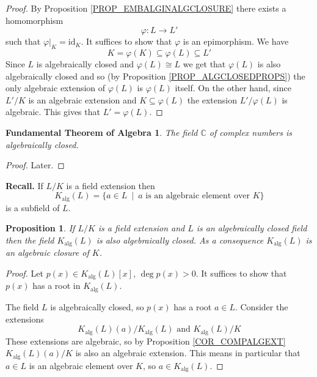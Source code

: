 \documentclass[12pt, letterpaper, oneside]{article}
\theoremstyle{plain}
\newtheorem{proposition}[theorem]{Proposition}
\newtheorem{FTALG}[theorem]{Fundamental Theorem of Algebra}
\theoremstyle{definition}
\newcommand{\C}{{\mathbb C}}
\newcommand{\id}{\mathrm{id}}
\newcommand{\vs}{\vskip 5mm}
\begin{document}
\vs\vs

\begin{proof}
By Proposition \ref{PROP_EMBALGINALGCLOSURE} there exists a homomorphism 
$$\varphi\colon L \to L'$$
such that $\varphi|_{K} = \id_{K}$. It suffices to show that $\varphi$ is an epimorphism. 
We have 
$$K = \varphi(K) \subseteq \varphi(L) \subseteq L'$$
Since $L$ is algebraically closed and $\varphi(L)\cong L$ we get that $\varphi(L)$ is 
also algebraically closed and so (by Proposition \ref{PROP_ALGCLOSEDPROPS})
the only algebraic extension of $\varphi(L)$ is $\varphi(L)$ itself. 
On the other hand, since $L'/K$ is an algebraic extension and 
$K\subseteq \varphi(L)$ the extension $L'/\varphi(L)$ is algebraic. This gives 
that $L' = \varphi(L)$.
\end{proof}



\vs\vs

\begin{FTALG}
\label{THM_FTALG}
The field $\C$ of complex numbers is algebraically closed. 
\end{FTALG}

\vs\vs

\begin{proof}
Later.
\end{proof}



\vs\vs


\textbf{Recall.} If $L/K$ is a field extension then 
$$K_{\text{alg}}(L) = \{a\in L \ \mid \ a \text{ is an algebraic element over } K\}$$
is a subfield of $L$. 


\vs\vs

\begin{proposition}
\label{PROP_KALGLALGCL}
If $L/K$ is a field extension and $L$ is an algebraically closed field then the field 
$K_{\text{alg}}(L)$ is also algebraically closed. As a consequence $K_{\text{alg}}(L)$
is an algebraic closure of $K$.
\end{proposition}

\vs

\begin{proof}
Let $p(x) \in K_{\text{alg}}(L)[x]$, $\deg p(x) >0$. It suffices to show that $p(x)$ has a root 
in $K_{\text{alg}}(L)$. 


The field  $L$ is algebraically closed, so  
$p(x)$ has a root $a\in L$. Consider the extensions 
$$ K_{\text{alg}}(L)(a)/K_{\text{alg}}(L)  \text{\ \ \ and \ \ \ }   K_{\text{alg}}(L)/K $$ 
These extensions are algebraic,  so by Proposition  \ref{COR_COMPALGEXT}
$K_{\text{alg}}(L)(a)/K$ is also an algebraic extension. This means in particular that 
$a\in L$ is an algebraic element over $K$, so $a\in K_{\text{alg}}(L)$.  
\end{proof}
\end{document}

